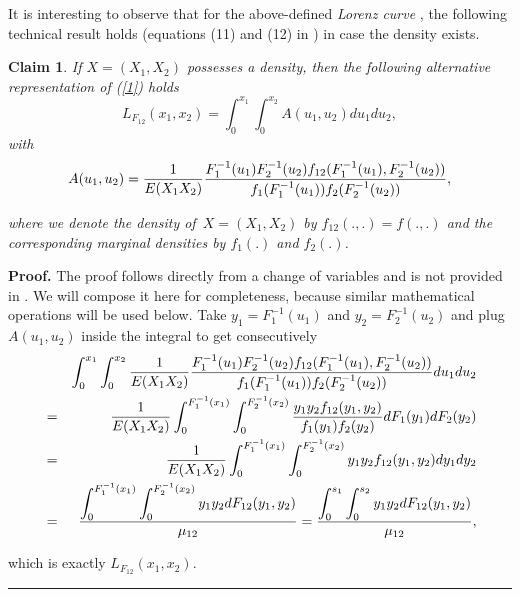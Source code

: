 \documentclass[onecolumn]{article}
\providecommand{\dint}{\displaystyle\int}
\newtheorem{claim}[theorem]{Claim}
\newenvironment{proof}[1][Proof]{\noindent\textbf{#1.} }{\ \rule{0.5em}{0.5em}}
\renewcommand{\dint}{\displaystyle\int}
\begin{document}
It is interesting to observe that for the above-defined \textit{Lorenz curve}%
, the following technical result holds (equations (11) and (12) in \cite{[6]}%
) in case the density exists.

\begin{claim}
\label{aux-cl} If \bigskip $X=(X_{1},X_{2})$ possesses a density, then the
following alternative representation of (\ref{1}) holds%
\begin{equation}
L_{F_{12}}(x_{1},x_{2})=\dint\nolimits_{0}^{x_{1}}\dint%
\nolimits_{0}^{x_{2}}A(u_{1},u_{2})du_{1}du_{2},  \label{2}
\end{equation}%
with 
\begin{equation}
A(u_{1},u_{2})=\frac{1}{E(X_{1}X_{2})}\frac{%
F_{1}^{-1}(u_{1})F_{2}^{-1}(u_{2})f_{12}(F_{1}^{-1}(u_{1}),F_{2}^{-1}(u_{2}))%
}{f_{1}(F_{1}^{-1}(u_{1}))f_{2}(F_{2}^{-1}(u_{2}))},  \label{3}
\end{equation}

where we denote the density of\ $X=(X_{1},X_{2})$ by $f_{12}(.,.)=f(.,.)$
and the corresponding marginal densities by $f_{1}(.)$ and $f_{2}(.)$.
\end{claim}

\begin{proof}
The proof follows directly from a change of variables and is not provided in 
\cite{[6]}. We will compose it here for completeness, because similar
mathematical operations will be used below. Take $y_{1}=F_{1}^{-1}(u_{1})$
and $y_{2}=F_{2}^{-1}(u_{2})$ and plug $A(u_{1},u_{2})$ inside the integral
to get consecutively%
\begin{eqnarray}
&&\dint\nolimits_{0}^{x_{1}}\dint\nolimits_{0}^{x_{2}}\frac{1}{E(X_{1}X_{2})}%
\frac{%
F_{1}^{-1}(u_{1})F_{2}^{-1}(u_{2})f_{12}(F_{1}^{-1}(u_{1}),F_{2}^{-1}(u_{2}))%
}{f_{1}(F_{1}^{-1}(u_{1}))f_{2}(F_{2}^{-1}(u_{2}))}du_{1}du_{2}  \notag \\
&=&\frac{1}{E(X_{1}X_{2})}\dint\nolimits_{0}^{F_{1}^{-1}(x_{1})}\dint%
\nolimits_{0}^{F_{2}^{-1}(x_{2})}\frac{y_{1}y_{2}f_{12}(y_{1},y_{2})}{%
f_{1}(y_{1})f_{2}(y_{2})}dF_{1}(y_{1})dF_{2}(y_{2})  \notag \\
&=&\frac{1}{E(X_{1}X_{2})}\dint\nolimits_{0}^{F_{1}^{-1}(x_{1})}\dint%
\nolimits_{0}^{F_{2}^{-1}(x_{2})}y_{1}y_{2}f_{12}(y_{1},y_{2})dy_{1}dy_{2} 
\notag \\
&=&\frac{\dint\nolimits_{0}^{F_{1}^{-1}(x_{1})}\dint%
\nolimits_{0}^{F_{2}^{-1}(x_{2})}y_{1}y_{2}dF_{12}(y_{1},y_{2})}{\mu _{12}}=%
\frac{\dint\nolimits_{0}^{s_{1}}\dint%
\nolimits_{0}^{s_{2}}y_{1}y_{2}dF_{12}(y_{1},y_{2})}{\mu _{12}},  \label{4}
\end{eqnarray}

which is exactly $L_{F_{12}}(x_{1},x_{2})$.
\end{proof}
\end{document}

